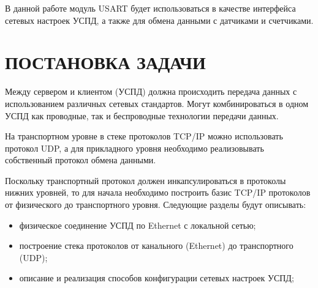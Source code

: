В данной работе модуль USART будет использоваться в качестве интерфейса сетевых настроек УСПД, а также для обмена данными с датчиками и счетчиками.

\newpage

\section{ПОСТАНОВКА ЗАДАЧИ}

Между сервером и клиентом (УСПД) должна происходить передача данных с использованием различных сетевых стандартов. Могут комбинироваться в одном УСПД как проводные, так и беспроводные технологии передачи данных.

На транспортном уровне в стеке протоколов TCP/IP можно использовать протокол UDP, а для прикладного уровня необходимо реализовывать собственный протокол обмена данными. 

Поскольку транспортный протокол должен инкапсулироваться в протоколы нижних уровней, то для начала необходимо построить базис TCP/IP протоколов от физического до транспортного уровня. Следующие разделы будут описывать:
\begin{itemize}
\item физическое соединение УСПД по Ethernet с локальной сетью;
\item построение стека протоколов от канального (Ethernet) до транспортного (UDP);
\item описание и реализация способов конфигурации сетевых настроек УСПД;
\end{itemize}



